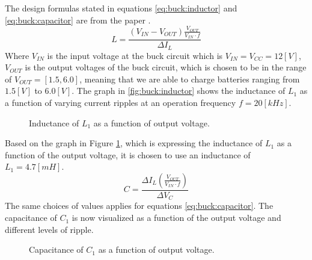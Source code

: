 \documentclass[../report.tex]{subfiles}
\begin{document}
The design formulas stated in equations \ref{eq:buck:inductor} and \ref{eq:buck:capacitor} are from the paper \cite{designtradeoff}.
\begin{equation} \label{eq:buck:inductor}
    L = \frac{\left( V_{IN} - V_{OUT} \right) \frac{V_{OUT}}{V_{IN} \cdot f} }{\Delta I_L}
\end{equation}
Where $V_{IN}$ is the input voltage at the buck circuit which is $V_{IN} = V_{CC} = 12 [V]$, $V_{OUT}$ is the output voltages of the buck circuit, which is chosen to be in the range of $V_{OUT} = [1.5, 6.0]$, meaning that we are able to charge batteries ranging from $1.5 [V]$ to $6.0 [V]$.
The graph in \autoref{fig:buck:inductor} shows the inductance of $L_1$ as a function of varying current ripples at an operation frequency $f = 20 [kHz]$.

\begin{figure}[H]
    \centering
    \noindent{}
    \caption{Inductance of $L_1$ as a function of output voltage.}
    \label{fig:buck:inductor}
\end{figure}

Based on the graph in Figure \ref{fig:buck:inductor}, which is expressing the inductance of $L_1$ as a function of the output voltage, it is chosen to use an inductance of $L_1 = 4.7 [mH]$.
\begin{equation} \label{eq:buck:capacitor}
    C = \frac{\Delta I_L \left( \frac{V_{OUT}}{V_{IN}\cdot f} \right)}{\Delta V_C}
\end{equation}
The same choices of values applies for equations \ref{eq:buck:capacitor}. The capacitance of $C_1$ is now visualized as a function of the output voltage and different levels of ripple.

\begin{figure}[H]
    \centering
    \noindent{}
    \caption{Capacitance of $C_1$ as a function of output voltage.}
    \label{fig:buck:capacitor}
\end{figure}
\end{document}
